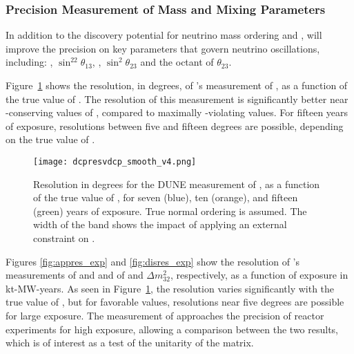 \subsubsection{Precision Measurement of Mass and Mixing Parameters}

In addition to the discovery potential for neutrino mass ordering and , 
 will improve the precision on key parameters that govern neutrino oscillations, including: \deltacp, $\sin^22\theta_{13}$, , $\sin^2\theta_{23}$ and the octant of $\theta_{23}$. 

Figure~\ref{fig:dcpresvdcp} shows the resolution, in degrees, of 's measurement of \deltacp, as a function of the true value of \deltacp. The resolution of this measurement is significantly better near -conserving values of \deltacp, compared to maximally -violating values. For fifteen years of exposure, resolutions between five and fifteen degrees are possible, depending on the true value of \deltacp. 

\begin{figure}[h!]
    \centering
		\texttt{[image: dcpresvdcp\_smooth\_v4.png]}
	\caption[Resolution for the DUNE measurement of \deltacp as a function of \deltacp]
	{Resolution in degrees for the DUNE measurement of \deltacp, as a function of the true value of \deltacp, for seven (blue), ten (orange), and fifteen (green) years of exposure. True normal ordering is assumed. The width of the band shows the impact of applying an external constraint on .}
    \label{fig:dcpresvdcp}
\end{figure}

Figures \ref{fig:appres_exp} and  \ref{fig:disres_exp} show the resolution of 's measurements of \deltacp and  and of  and $\Delta m^{2}_{32}$, respectively, as a function of exposure in kt-MW-years. As seen in Figure~\ref{fig:dcpresvdcp}, the \deltacp resolution varies significantly with the true value of \deltacp, but for favorable values, resolutions near five degrees are possible for large exposure. The  measurement of  approaches the precision of reactor experiments for high exposure, allowing a comparison between the two results, which is of interest as a test of the unitarity of the  matrix. 

